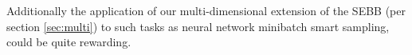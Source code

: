 Additionally the application of our multi-dimensional extension of the SEBB (per section \ref{sec:multi}) to such tasks as neural network minibatch smart sampling, could be quite rewarding.








